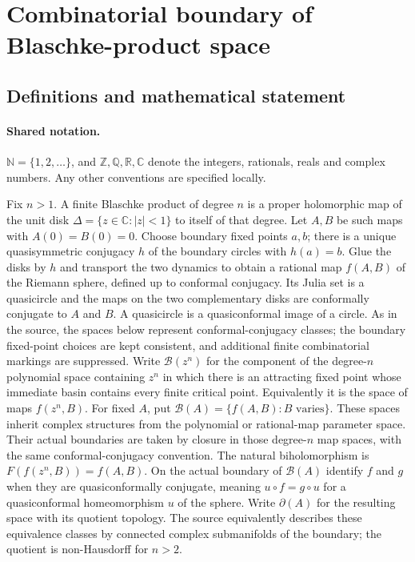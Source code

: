 \documentclass[11pt]{article}
\begin{document}
\section{Combinatorial boundary of Blaschke-product space}\label{statement}

\subsection{Definitions and mathematical statement}

\paragraph{Shared notation.}$\mathbb N=\{1,2,\ldots\}$, and $\mathbb Z,\mathbb Q,\mathbb R,\mathbb C$ denote the integers, rationals, reals and complex numbers. Any other conventions are specified locally.


Fix $n>1$. A finite Blaschke product of degree $n$ is a proper holomorphic map of the unit disk $\Delta=\{z\in\mathbb C:|z|<1\}$ to itself of that degree. Let $A,B$ be such maps with $A(0)=B(0)=0$. Choose boundary fixed points $a,b$; there is a unique quasisymmetric conjugacy $h$ of the boundary circles with $h(a)=b$. Glue the disks by $h$ and transport the two dynamics to obtain a rational map $f(A,B)$ of the Riemann sphere, defined up to conformal conjugacy. Its Julia set is a quasicircle and the maps on the two complementary disks are conformally conjugate to $A$ and $B$. A quasicircle is a quasiconformal image of a circle. As in the source, the spaces below represent conformal-conjugacy classes; the boundary fixed-point choices are kept consistent, and additional finite combinatorial markings are suppressed.
Write $\mathcal B(z^n)$ for the component of the degree-$n$ polynomial space containing $z^n$ in which there is an attracting fixed point whose immediate basin contains every finite critical point. Equivalently it is the space of maps $f(z^n,B)$. For fixed $A$, put $\mathcal B(A)=\{f(A,B):B\text{ varies}\}$. These spaces inherit complex structures from the polynomial or rational-map parameter space. Their actual boundaries are taken by closure in those degree-$n$ map spaces, with the same conformal-conjugacy convention. The natural biholomorphism is $F(f(z^n,B))=f(A,B)$.
On the actual boundary of $\mathcal B(A)$ identify $f$ and $g$ when they are quasiconformally conjugate, meaning $u\circ f=g\circ u$ for a quasiconformal homeomorphism $u$ of the sphere. Write $\partial(A)$ for the resulting space with its quotient topology. The source equivalently describes these equivalence classes by connected complex submanifolds of the boundary; the quotient is non-Hausdorff for $n>2$.
\end{document}
